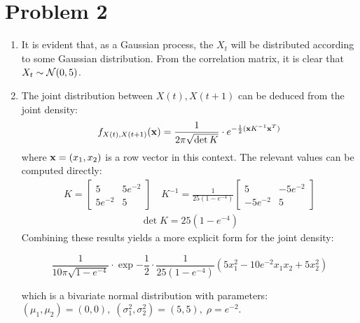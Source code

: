 \documentclass[12pt]{article}%
\begin{document}
\section{Problem 2}
\begin{enumerate}
  \item It is evident that, as a Gaussian process, the $X_t$ will be distributed according to some Gaussian distribution. From the correlation matrix, it is clear that $X_t \sim \mathcal{N}(0,5)$.

  \item
  The joint distribution between $X(t),X(t+1)$ can be deduced from the joint density:
  \begin{align*}
    f_{X(t),X(t+1)}({\bold x}) = \frac{1}{2\pi \sqrt{\det K}} \cdot e^{-\frac{1}{2}({\bold x} K^{-1} {\bold x}^T)}
  \end{align*}
  where ${\bold x} = (x_1,x_2)$ is a row vector in this context. The relevant values can be computed directly:
        \begin{align*}
        K  = \begin{bmatrix} 5 & 5e^{{-2}} \\ 5e^{{-2}} & 5\end{bmatrix} \quad
    K^{-1}  = \frac{1}{25(1 - e^{-4})}\begin{bmatrix}
        5 & -5e^{-2} \\  -5e^{-2} & 5
  \end{bmatrix}
        \end{align*}
        \begin{align*}
          \det K  = 25(1 - e^{-4})
        \end{align*}
        Combining these results yields a more explicit form for the joint density:

        \[\frac{1}{10\pi\sqrt{1 - e^{-4}}}\cdot \exp{-\frac{1}{2}\cdot \frac{1}{25(1-e^{-4})}\left(5x_1^{2} - 10e^{-2}x_{1}x_{2} + 5x_{2}^{2} \right)} \]

        which is a bivariate normal distribution with parameters: $(\mu_{1},\mu_{2}) = (0,0),\; (\sigma_{1}^{2}, \sigma_{2}^{2}) = (5,5), \; \rho =  e^{-2}$.
\end{enumerate}
\end{document}
